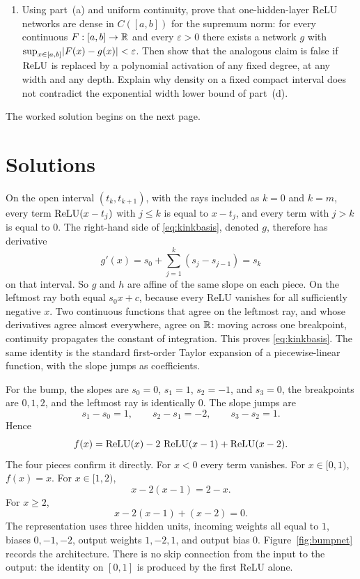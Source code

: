 \begin{enumerate}[label=\textbf{(\alph*)}]
  \item Using part~(a) and uniform continuity, prove that one-hidden-layer ReLU networks are dense in \(C([a,b])\) for the supremum norm: for every continuous \(F:[a,b]\to\mathbb{R}\) and every \(\varepsilon>0\) there exists a network \(g\) with \(\sup_{x\in[a,b]}\lvert F(x)-g(x)\rvert<\varepsilon\). Then show that the analogous claim is false if \(\operatorname{ReLU}\) is replaced by a polynomial activation of any fixed degree, at any width and any depth. Explain why density on a fixed compact interval does not contradict the exponential width lower bound of part~(d).
\end{enumerate}

The worked solution begins on the next page.

\clearpage
\section{Solutions}


On the open interval \((t_k, t_{k+1})\), with the rays included as \(k=0\) and \(k=m\), every term \(\operatorname{ReLU}(x-t_j)\) with \(j\le k\) is equal to \(x-t_j\), and every term with \(j>k\) is equal to \(0\). The right-hand side of \eqref{eq:kinkbasis}, denoted \(g\), therefore has derivative
\[
  g'(x)
  =
  s_0 + \sum_{j=1}^{k} (s_j - s_{j-1})
  =
  s_k
\]
on that interval. So \(g\) and \(h\) are affine of the same slope on each piece. On the leftmost ray both equal \(s_0 x + c\), because every ReLU vanishes for all sufficiently negative \(x\). Two continuous functions that agree on the leftmost ray, and whose derivatives agree almost everywhere, agree on \(\mathbb{R}\): moving across one breakpoint, continuity propagates the constant of integration. This proves \eqref{eq:kinkbasis}. The same identity is the standard first-order Taylor expansion of a piecewise-linear function, with the slope jumps as coefficients.

For the bump, the slopes are \(s_0=0\), \(s_1=1\), \(s_2=-1\), and \(s_3=0\), the breakpoints are \(0,1,2\), and the leftmost ray is identically \(0\). The slope jumps are
\[
  s_1-s_0 = 1,
  \qquad
  s_2-s_1 = -2,
  \qquad
  s_3-s_2 = 1.
\]
Hence
\begin{equation}
  f(x) = \operatorname{ReLU}(x) - 2\,\operatorname{ReLU}(x-1) + \operatorname{ReLU}(x-2).
  \label{eq:bump-relu}
\end{equation}
The four pieces confirm it directly. For \(x<0\) every term vanishes. For \(x\in[0,1)\), \(f(x)=x\). For \(x\in[1,2)\),
\[
  x - 2(x-1) = 2-x.
\]
For \(x\ge 2\),
\[
  x - 2(x-1) + (x-2) = 0.
\]
The representation uses three hidden units, incoming weights all equal to \(1\), biases \(0,-1,-2\), output weights \(1,-2,1\), and output bias \(0\). Figure~\ref{fig:bumpnet} records the architecture. There is no skip connection from the input to the output: the identity on \([0,1]\) is produced by the first ReLU alone.

